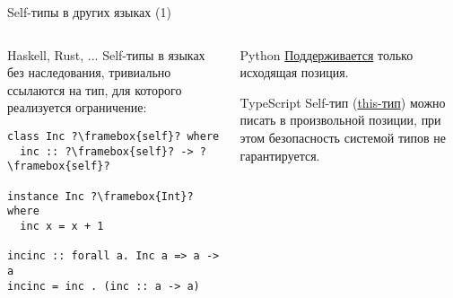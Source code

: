 \documentclass[handout,aspectratio=169,usenames,dvipsnames]{beamer}
\begin{document}
\begin{frame}[fragile]{Self-типы в других языках (1)}
    \begin{columns}[onlytextwidth]
        \begin{column}{0.46\textwidth}
            \begin{block}{Haskell, Rust, ...}
                Self-типы в языках без наследования, тривиально ссылаются на тип, для которого реализуется ограничение:
                \begin{verbatim}
class Inc ?\framebox{self}? where
  inc :: ?\framebox{self}? -> ?\framebox{self}?

instance Inc ?\framebox{Int}? where
  inc x = x + 1

incinc :: forall a. Inc a => a -> a
incinc = inc . (inc :: a -> a)
                \end{verbatim}
            \end{block}
        \end{column}\hfill%
        \pause
        \begin{column}{0.50\textwidth}
            \begin{block}{Python}
                \href{https://peps.python.org/pep-0673/}{\color{blue}Поддерживается}
                 только исходящая позиция.
            \end{block}
            \begin{block}{TypeScript}
                Self-тип (\href{https://www.typescriptlang.org/docs/handbook/2/classes.html\#this-types}{\color{blue}this-тип}) можно писать в произвольной позиции, при этом безопасность системой типов не гарантируется.
            \end{block}
        \end{column}
    \end{columns}
\end{frame}
\end{document}
